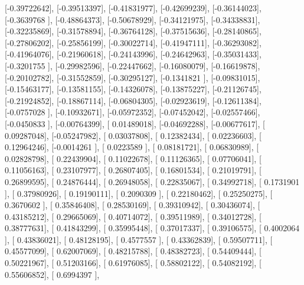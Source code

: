 \documentclass{article}
\begin{document}
       [-0.39722642],
       [-0.39513397],
       [-0.41831977],
       [-0.42699239],
       [-0.36144023],
       [-0.3639768 ],
       [-0.48864373],
       [-0.50678929],
       [-0.34121975],
       [-0.34338831],
       [-0.32235869],
       [-0.31578894],
       [-0.36764128],
       [-0.37515636],
       [-0.28140865],
       [-0.27806202],
       [-0.25856199],
       [-0.30022714],
       [-0.41947111],
       [-0.36293082],
       [-0.41964076],
       [-0.21960618],
       [-0.24143996],
       [-0.24642963],
       [-0.35031433],
       [-0.3201755 ],
       [-0.29982596],
       [-0.22447662],
       [-0.16080079],
       [-0.16619878],
       [-0.20102782],
       [-0.31552859],
       [-0.30295127],
       [-0.1341821 ],
       [-0.09831015],
       [-0.15463177],
       [-0.13581155],
       [-0.14326078],
       [-0.13875227],
       [-0.21126745],
       [-0.21924852],
       [-0.18867114],
       [-0.06804305],
       [-0.02923619],
       [-0.12611384],
       [-0.0757028 ],
       [-0.10932671],
       [-0.05972352],
       [-0.07452042],
       [-0.02557466],
       [-0.0450833 ],
       [-0.00764399],
       [ 0.01489018],
       [-0.04692288],
       [-0.00677617],
       [ 0.09287048],
       [-0.05247982],
       [ 0.03037808],
       [ 0.12382434],
       [ 0.02236603],
       [ 0.12964246],
       [-0.0014261 ],
       [ 0.0223589 ],
       [ 0.08181721],
       [ 0.06830989],
       [ 0.02828798],
       [ 0.22439904],
       [ 0.11022678],
       [ 0.11126365],
       [ 0.07706041],
       [ 0.11056163],
       [ 0.23107977],
       [ 0.26807405],
       [ 0.16801534],
       [ 0.21019791],
       [ 0.26899595],
       [ 0.24876444],
       [ 0.26948058],
       [ 0.22835067],
       [ 0.34992718],
       [ 0.1731901 ],
       [ 0.37980926],
       [ 0.19190111],
       [ 0.2090309 ],
       [ 0.22180462],
       [ 0.25250275],
       [ 0.3670602 ],
       [ 0.35846408],
       [ 0.28530169],
       [ 0.39310942],
       [ 0.30436074],
       [ 0.43185212],
       [ 0.29665069],
       [ 0.40714072],
       [ 0.39511989],
       [ 0.34012728],
       [ 0.38777631],
       [ 0.41843299],
       [ 0.35995448],
       [ 0.37017337],
       [ 0.39106575],
       [ 0.4002064 ],
       [ 0.43836021],
       [ 0.48128195],
       [ 0.4577557 ],
       [ 0.43362839],
       [ 0.59507711],
       [ 0.45577099],
       [ 0.62007069],
       [ 0.48215788],
       [ 0.48382723],
       [ 0.54409444],
       [ 0.50221967],
       [ 0.51203166],
       [ 0.61976085],
       [ 0.58802122],
       [ 0.54082192],
       [ 0.55606852],
       [ 0.6994397 ],
\end{document}
